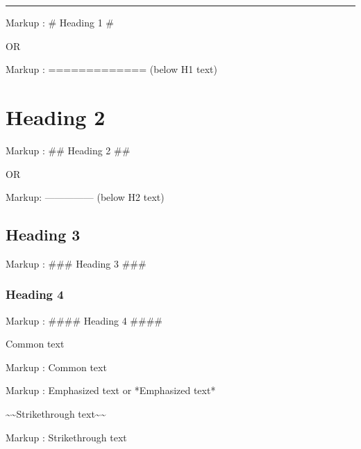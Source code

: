 \documentclass[letterpaper,10pt,english]{sphinxmanual}
\begin{document}
\bigskip\hrule\bigskip


\sphinxAtStartPar
Markup :  \# Heading 1 \#

\sphinxAtStartPar
\sphinxhyphen{}OR\sphinxhyphen{}

\sphinxAtStartPar
Markup :  ============= (below H1 text)


\section{Heading 2}
\label{\detokenize{chapter3:heading-2}}
\sphinxAtStartPar
Markup :  \#\# Heading 2 \#\#

\sphinxAtStartPar
\sphinxhyphen{}OR\sphinxhyphen{}

\sphinxAtStartPar
Markup: ————— (below H2 text)


\subsection{Heading 3}
\label{\detokenize{chapter3:heading-3}}
\sphinxAtStartPar
Markup :  \#\#\# Heading 3 \#\#\#


\subsubsection{Heading 4}
\label{\detokenize{chapter3:heading-4}}
\sphinxAtStartPar
Markup :  \#\#\#\# Heading 4 \#\#\#\#

\sphinxAtStartPar
Common text

\begin{sphinxVerbatim}[commandchars=\\\{\}]
Markup :  Common text
\end{sphinxVerbatim}

\sphinxAtStartPar
{}

\begin{sphinxVerbatim}[commandchars=\\\{\}]
Markup :  \PYGZus{}Emphasized text\PYGZus{} or *Emphasized text*
\end{sphinxVerbatim}

\sphinxAtStartPar
\textasciitilde{}\textasciitilde{}Strikethrough text\textasciitilde{}\textasciitilde{}

\begin{sphinxVerbatim}[commandchars=\\\{\}]
Markup :  \PYGZti{}\PYGZti{}Strikethrough text\PYGZti{}\PYGZti{}
\end{sphinxVerbatim}
\end{document}
